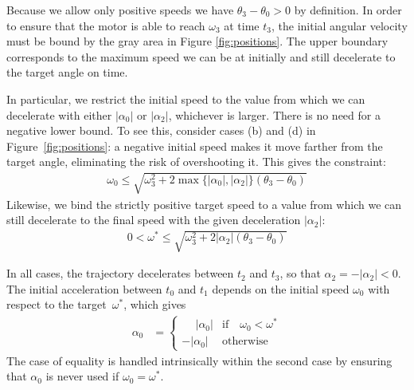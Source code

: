 \documentclass[12pt, a4paper]
{article}
\providecommand{\lr}[1]{\left(#1\right)}
\providecommand{\w}{\omega}
\providecommand{\wt}{\w^*}
\renewcommand{\th}{\theta}
\renewcommand{\a}{\alpha}
\providecommand{\abs}[1]{\left|#1\right|}
\begin{document}
Because we allow only positive speeds we have $\th_3-\th_0 > 0$ by
definition. In order to ensure that the motor is able to reach $\w_3$ at time
$t_3$, the initial angular velocity must be bound by the gray area in Figure
\ref{fig:positions}. The upper boundary corresponds to the maximum speed
we can be at initially and still decelerate to the target angle on time.

In particular, we restrict the initial speed to the value from which we can
decelerate with either $\abs{\a_0}$ or $\abs{\a_2}$, whichever is larger.
There is no need for a negative lower bound. To see this, consider cases (b)
and (d) in Figure~\ref{fig:positions}: a negative initial speed makes it move
farther from the target angle, eliminating the risk of overshooting it. This
gives the constraint:
%
\begin{align}
    \w_0 \leq \sqrt{\w_3^2 + 2 \max\{ \abs{\a_0}, \abs{\a_2}\}\lr{\th_3-\th_0}}
\end{align}
%
Likewise, we bind the strictly positive target speed to a value from which we
can still decelerate to the final speed with the given deceleration
$\abs{\a_2}$:
%
\begin{align}
    0 < \wt \leq \sqrt{\w_3^2 + 2\abs{\a_2}\lr{\th_3-\th_0}}
\end{align}
%

In all cases, the trajectory decelerates between $t_2$ and $t_3$, so that
$\a_2  = - \abs{\a_2} < 0$. The initial acceleration between $t_0$ and $t_1$
depends on the initial speed $\w_0$ with respect to the \mbox{target $\wt$},
which gives
%
\begin{align}
    \label{eq:a:accel0}
    \a_0 &= 
        \begin{cases}
        \phantom{-}\abs{\a_0} & \text{if} \quad \w_0 < \wt\\ 
        -\abs{\a_0} &  \text{otherwise}
        \end{cases}
\end{align}
%
The case of equality is handled intrinsically within the
second case by ensuring that $\a_0$ is never used if $\w_0 = \wt$.
\end{document}

